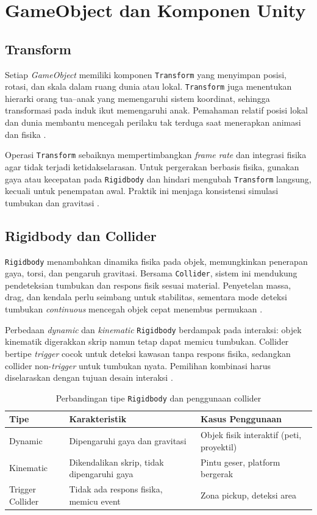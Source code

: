 \documentclass[../main.tex]{subfiles}
\begin{document}
\chapter{GameObject dan Komponen Unity}

\section{Transform}
Setiap \textit{GameObject} memiliki komponen \texttt{Transform} yang menyimpan posisi, rotasi, dan skala dalam ruang dunia atau lokal. \texttt{Transform} juga menentukan hierarki orang tua–anak yang memengaruhi sistem koordinat, sehingga transformasi pada induk ikut memengaruhi anak. Pemahaman relatif posisi lokal dan dunia membantu mencegah perilaku tak terduga saat menerapkan animasi dan fisika \parencite{unity-transform,unity-gameobjects}.

Operasi \texttt{Transform} sebaiknya mempertimbangkan \textit{frame rate} dan integrasi fisika agar tidak terjadi ketidakselarasan. Untuk pergerakan berbasis fisika, gunakan gaya atau kecepatan pada \texttt{Rigidbody} dan hindari mengubah \texttt{Transform} langsung, kecuali untuk penempatan awal. Praktik ini menjaga konsistensi simulasi tumbukan dan gravitasi \parencite{unity-transform}.

\section{Rigidbody dan Collider}
\texttt{Rigidbody} menambahkan dinamika fisika pada objek, memungkinkan penerapan gaya, torsi, dan pengaruh gravitasi. Bersama \texttt{Collider}, sistem ini mendukung pendeteksian tumbukan dan respons fisik sesuai material. Penyetelan massa, drag, dan kendala perlu seimbang untuk stabilitas, sementara mode deteksi tumbukan \textit{continuous} mencegah objek cepat menembus permukaan \parencite{unity-rigidbody,unity-collider}.

Perbedaan \textit{dynamic} dan \textit{kinematic} \texttt{Rigidbody} berdampak pada interaksi: objek kinematik digerakkan skrip namun tetap dapat memicu tumbukan. Collider bertipe \textit{trigger} cocok untuk deteksi kawasan tanpa respons fisika, sedangkan collider non-\textit{trigger} untuk tumbukan nyata. Pemilihan kombinasi harus diselaraskan dengan tujuan desain interaksi \parencite{unity-collider}.

\begin{table}[h]
  \centering
  \caption{Perbandingan tipe \texttt{Rigidbody} dan penggunaan collider}
  \begin{tabularx}{\textwidth}{@{}lXX@{}}
    \toprule
    Tipe & Karakteristik & Kasus Penggunaan \\
    \midrule
    Dynamic & Dipengaruhi gaya dan gravitasi & Objek fisik interaktif (peti, proyektil) \\
    Kinematic & Dikendalikan skrip, tidak dipengaruhi gaya & Pintu geser, platform bergerak \\
    Trigger Collider & Tidak ada respons fisika, memicu event & Zona pickup, deteksi area \\
    \bottomrule
  \end{tabularx}
\end{table}
\end{document}

